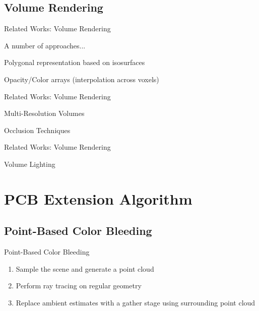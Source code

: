 \documentclass[compress,professionalfont]{beamer}
\begin{document}
\subsection{Volume Rendering}
\begin{frame}{Related Works: Volume Rendering}

    A number of approaches...

    Polygonal representation based on isosurfaces

    Opacity/Color arrays (interpolation across voxels)

\end{frame}




\begin{frame}{Related Works: Volume Rendering}

    Multi-Resolution Volumes

    Occlusion Techniques

\end{frame}




\begin{frame}{Related Works: Volume Rendering}

    Volume Lighting

\end{frame}




\section{PCB Extension Algorithm}
\subsection{Point-Based Color Bleeding}
\begin{frame}{Point-Based Color Bleeding}

    \begin{enumerate}
        \item Sample the scene and generate a point cloud
        \item Perform ray tracing on regular geometry
        \item Replace ambient estimates with a gather stage using surrounding point cloud
    \end{enumerate}

\end{frame}
\end{document}
